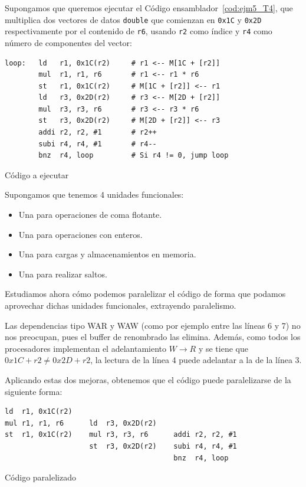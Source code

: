 \begin{ejemplo}
    Supongamos que queremos ejecutar el Código ensamblador~\ref{cod:ejm5_T4}, que multiplica dos vectores de datos \verb|double| que comienzan en \verb|0x1C| y \verb|0x2D| respectivamente por el contenido de \verb|r6|, usando \verb|r2| como índice y \verb|r4| como número de componentes del vector:\\
    \begin{listing}[H]
    \begin{verbatim}
loop:   ld   r1, 0x1C(r2)     # r1 <-- M[1C + [r2]]
        mul  r1, r1, r6       # r1 <-- r1 * r6
        st   r1, 0x1C(r2)     # M[1C + [r2]] <-- r1
        ld   r3, 0x2D(r2)     # r3 <-- M[2D + [r2]]
        mul  r3, r3, r6       # r3 <-- r3 * r6
        st   r3, 0x2D(r2)     # M[2D + [r2]] <-- r3
        addi r2, r2, #1       # r2++
        subi r4, r4, #1       # r4--
        bnz  r4, loop         # Si r4 != 0, jump loop
    \end{verbatim}
    \caption{Código a ejecutar}
    \label{cod:ejm5_T4}
    \end{listing}

    Supongamos que tenemos 4 unidades funcionales: 
    \begin{itemize}
        \item Una para operaciones de coma flotante.
        \item Una para operaciones con enteros.
        \item Una para cargas y almacenamientos en memoria.
        \item Una para realizar saltos.
    \end{itemize}
    Estudiamos ahora cómo podemos paralelizar el código de forma que podamos aprovechar dichas unidades funcionales, extrayendo paralelismo.

    Las dependencias tipo WAR y WAW (como por ejemplo entre las líneas 6 y 7) no nos preocupan, pues el buffer de renombrado las elimina. Además, como todos los procesadores implementan el adelantamiento $W\rightarrow R$ y se tiene que $0x1C + r2 \neq 0x2D + r2$, la lectura de la línea 4 puede adelantar a la de la línea 3. 

    Aplicando estas dos mejoras, obtenemos que el código puede paralelizarse de la siguiente forma:\\
    \begin{listing}[H]
    \begin{verbatim}
ld  r1, 0x1C(r2)
mul r1, r1, r6      ld  r3, 0x2D(r2)
st  r1, 0x1C(r2)    mul r3, r3, r6      addi r2, r2, #1
                    st  r3, 0x2D(r2)    subi r4, r4, #1
                                        bnz  r4, loop
    \end{verbatim}
    \caption{Código paralelizado}
    \label{cod:ejm4_T4_paralelizado}
    \end{listing}


\end{ejemplo}
